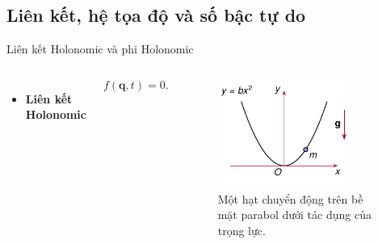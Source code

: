 \subsection{Liên kết, hệ tọa độ và số bậc tự do}

\begin{frame}{Liên kết Holonomic và phi Holonomic}
\vspace{-4mm}
\begin{columns}
    \begin{itemize}
        \item\textbf{Liên kết Holonomic}
    \end{itemize}
    \begin{equation}
        f \left( \mathbf{q}, t \right) = 0.
    \end{equation}
    \vspace{-9mm}
    \begin{figure}
        \centering
        \includegraphics[width=0.8\textwidth]{Figures/Parabol_motion.pdf}
        \vspace{-6mm}
        \caption{Một hạt chuyển động trên bề mặt parabol dưới tác dụng của trọng lực.}
    \end{figure}


\end{columns}
\end{frame}
